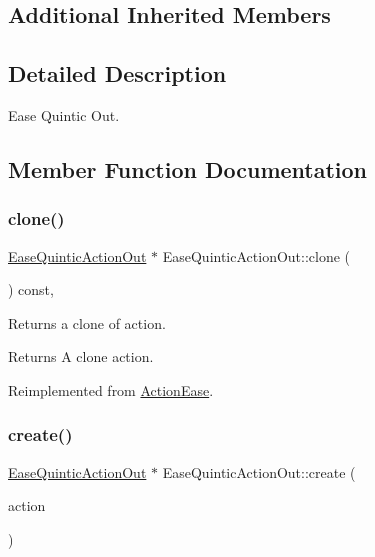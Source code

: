 \subsection*{Additional Inherited Members}


\subsection{Detailed Description}
Ease Quintic Out. 

\subsection{Member Function Documentation}
\mbox{\label{classEaseQuinticActionOut_aa64dfcfe97d7f5b6684f7fd1ad252492}} 
\subsubsection{\texorpdfstring{clone()}{clone()}}
{\footnotesize\ttfamily \hyperlink{classEaseQuinticActionOut}{Ease\+Quintic\+Action\+Out} $\ast$ Ease\+Quintic\+Action\+Out\+::clone (\begin{DoxyParamCaption}\item[{void}]{ }\end{DoxyParamCaption}) const\hspace{0.3cm}{\ttfamily [override]}, {\ttfamily [virtual]}}

Returns a clone of action.

\begin{DoxyReturn}{Returns}
A clone action. 
\end{DoxyReturn}


Reimplemented from \hyperlink{classActionEase_a39bec93fe161fb732a74d8e51a2fe08b}{Action\+Ease}.

\mbox{\label{classEaseQuinticActionOut_a3934ba74423ed596dc34ef8505789174}} 
\subsubsection{\texorpdfstring{create()}{create()}}
{\footnotesize\ttfamily \hyperlink{classEaseQuinticActionOut}{Ease\+Quintic\+Action\+Out} $\ast$ Ease\+Quintic\+Action\+Out\+::create (\begin{DoxyParamCaption}\item[{\hyperlink{classActionInterval}{Action\+Interval} $\ast$}]{action }\end{DoxyParamCaption})\hspace{0.3cm}{\ttfamily [static]}}



